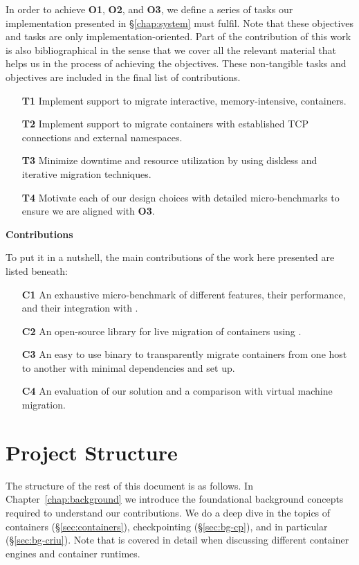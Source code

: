 In order to achieve \textbf{O1}, \textbf{O2}, and \textbf{O3}, we define a
series of tasks our implementation presented in \S\ref{chap:system} must
fulfil.
Note that these objectives and tasks are only implementation-oriented.
Part of the contribution of this work is also bibliographical in the sense that
we cover all the relevant material that helps us in the process of achieving
the objectives.
These non-tangible tasks and objectives are included in the final list of
contributions.
\begin{itemize}
    \item[\textbf{T1}] Implement support to migrate interactive,
          memory-intensive, containers.
    \item[\textbf{T2}] Implement support to migrate containers with
          established TCP connections and external namespaces.
    \item[\textbf{T3}] Minimize downtime and resource utilization by using
          diskless and iterative migration techniques.
    \item[\textbf{T4}] Motivate each of our design choices with detailed
          micro-benchmarks to ensure we are aligned with \textbf{O3}.
\end{itemize}

\textbf{Contributions}

To put it in a nutshell, the main contributions of the work here presented are
listed beneath:
\begin{itemize}
    \item[\textbf{C1}] An exhaustive
          micro-benchmark of different \criu features, their performance, and their
          integration with \runc.
    \item[\textbf{C2}] An open-source library for live migration of \runc
          containers using \criu.
    \item[\textbf{C3}] An easy to use binary to transparently migrate
          containers from one host to another with minimal dependencies and set up.
    \item[\textbf{C4}] An evaluation of our solution and a comparison with
          virtual machine migration.
\end{itemize}

\section{Project Structure}

The structure of the rest of this document is as follows.
In Chapter~\ref{chap:background} we introduce the foundational background
concepts required to understand our contributions.
We do a deep dive in the topics of containers (\S\ref{sec:containers}),
checkpointing (\S\ref{sec:bg-cp}), and \criu in particular
(\S\ref{sec:bg-criu}).
Note that \runc is covered in detail when discussing different container
engines and container runtimes.

